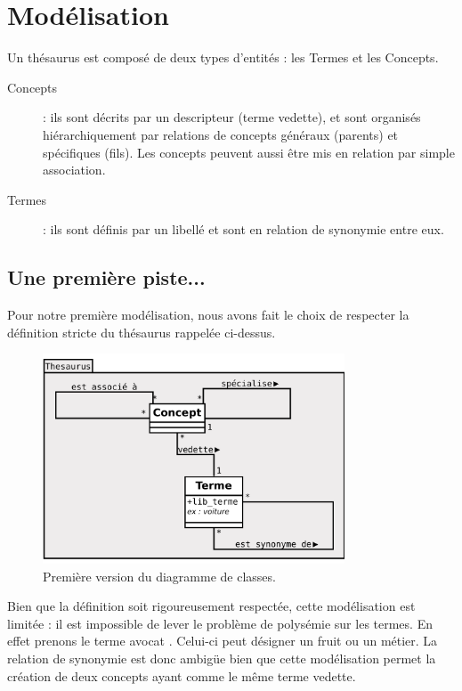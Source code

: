 \section{Modélisation} 

Un thésaurus est composé de deux types d'entités : les Termes et les Concepts.
\begin{description}
\item[Concepts] : ils sont décrits par un descripteur (terme vedette), et sont organisés hiérarchiquement par relations de concepts généraux (parents) et spécifiques (fils). Les concepts peuvent aussi être mis en relation par simple association.
\item[Termes] : ils sont définis par un libellé et sont en relation de synonymie entre eux.
\end{description}

\subsection{Une première piste...}
Pour notre première modélisation, nous avons fait le choix de respecter la définition stricte du thésaurus rappelée ci-dessus.

\begin{figure}[H]
\begin{center}
\includegraphics[width=0.8\textwidth]{files/class_v1}
\end{center}
\caption{Première version du diagramme de classes.}
\end{figure}

Bien que la définition soit rigoureusement respectée, cette modélisation est limitée : il est impossible de lever le problème de polysémie sur les termes. En effet prenons le terme \og avocat \fg. Celui-ci peut désigner un fruit ou un métier. La relation de synonymie est donc ambigüe bien que cette modélisation permet la création de deux concepts ayant comme le même terme vedette.

